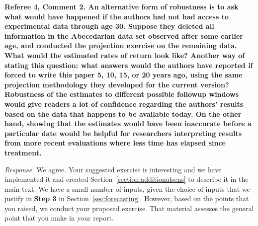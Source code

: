 \noindent \textbf{Referee 4, Comment 2. An alternative form of robustness is to ask what would have happened if the authors had not had access to experimental data through age 30. Suppose they deleted all information in the Abecedarian data set observed after some earlier age, and conducted the projection exercise on the remaining data. What would the estimated rates of return look like? Another way of stating this question: what answers would the authors have reported if forced to write this paper 5, 10, 15, or 20 years ago, using the same projection methodology they developed for the current version? Robustness of the estimates to different possible followup windows would give readers a lot of confidence regarding the authors' results based on the data that happens to be available today. On the other hand, showing that the estimates would have been inaccurate before a particular date would be helpful for researchers interpreting results from more recent evaluations where less time has elapsed since treatment.}

\noindent \textit{Response.} We agree. Your suggested exercise is interesting and we have implemented it and created Section~\ref{section:additionalsens} to describe it in the main text. We have a small number of inputs, given the choice of inputs that we justify in \textbf{Step 3} in Section~\ref{sec:forecasting}. However, based on the points that you raised, we conduct your proposed exercise. That material assesses the general point that you make in your report.

\singlespace




